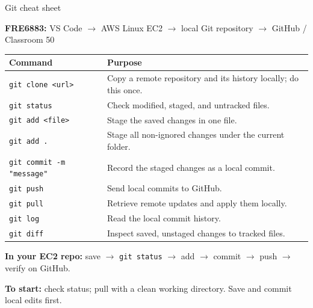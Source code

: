 \documentclass[10pt,aspectratio=169]{beamer}
\newcommand{\gitcmd}[1]{{\color{BootcampBlueDark}\texttt{#1}}}
\begin{document}
\begin{frame}{Git cheat sheet}
  \relax
  {\small\textbf{FRE6883:} VS Code $\to$ AWS Linux EC2 $\to$ local Git repository
  $\to$ GitHub / Classroom 50\par}
  \medskip
  {\small
    \renewcommand{\arraystretch}{1.0}
    \begin{tabularx}{\textwidth}{@{}l@{\hspace{2em}}X@{}}
      \toprule
      \textbf{Command} & \textbf{Purpose} \\
      \midrule
      \gitcmd{git clone <url>} & Copy a remote repository and its history locally; do this once. \\
      \gitcmd{git status} & Check modified, staged, and untracked files. \\
      \gitcmd{git add <file>} & Stage the saved changes in one file. \\
      \gitcmd{git add .} & Stage all non-ignored changes under the current folder. \\
      \gitcmd{git commit -m "message"} & Record the staged changes as a local commit. \\
      \gitcmd{git push} & Send local commits to GitHub. \\
      \gitcmd{git pull} & Retrieve remote updates and apply them locally. \\
      \gitcmd{git log} & Read the local commit history. \\
      \gitcmd{git diff} & Inspect saved, unstaged changes to tracked files. \\
      \bottomrule
    \end{tabularx}\par
  }
  \smallskip
  {\small
    \textbf{In your EC2 repo:} save $\to$ \gitcmd{git status} $\to$ add $\to$ commit $\to$ push
    $\to$ verify on GitHub.\par
    \textbf{To start:} check status; pull with a clean working directory. Save and commit local edits first.\par
  }
\end{frame}
\end{document}
